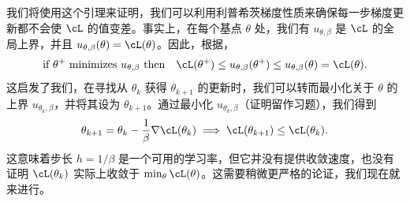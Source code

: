 \documentclass[../../book-main_zh.tex]{subfiles}
\begin{document}
我们将使用这个引理来证明，我们可以利用利普希茨梯度性质来确保每一步梯度更新都不会使 \(\cL\) 的值变差。事实上，在每个基点 \(\theta\) 处，我们有 \(u_{\theta, \beta}\) 是 \(\cL\) 的全局上界，并且 \(u_{\theta, \beta}(\theta) = \cL(\theta)\)。因此，根据，
\begin{equation}
    \text{if \(\theta^{+}\) minimizes \(u_{\theta, \beta}\) then}
    \quad \cL(\theta^{+}) \leq u_{\theta, \beta}(\theta^{+}) \leq
    u_{\theta, \beta}(\theta) = \cL(\theta).
\end{equation}
这启发了我们，在寻找从 \(\theta_{k}\) 获得 \(\theta_{k + 1}\) 的更新时，我们可以转而最小化关于 \(\theta\) 的上界 \(u_{\theta_{k}, \beta}\)，并将其设为 \(\theta_{k + 1}\)。通过最小化 \(u_{\theta_{k}, \beta}\)（证明留作习题），我们得到
\begin{equation}\label{eq:GD}
    \theta_{k + 1} = \theta_{k} - \frac{1}{\beta}\nabla
    \cL(\theta_{k}) \implies \cL(\theta_{k + 1}) \leq \cL(\theta_{k}).
\end{equation}
这意味着步长 \(h = 1/\beta\) 是一个可用的学习率，但它并没有提供收敛速度，也没有证明 \(\cL(\theta_{k})\) 实际上收敛于 \(\min_{\theta}\cL(\theta)\)。这需要稍微更严格的论证，我们现在就来进行。
\end{document}
